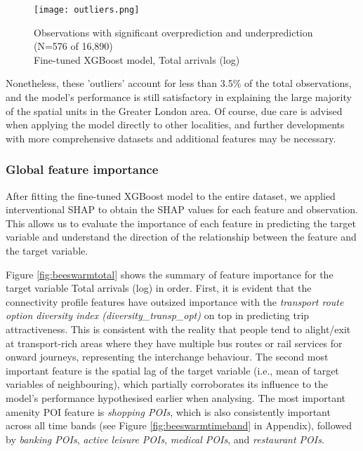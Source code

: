 \begin{figure}[ht]
    \centering
    \texttt{[image: outliers.png]}
    \captionsetup{justification=centering}
    \caption{Observations with significant overprediction and underprediction (N=576 of 16,890)\\Fine-tuned XGBoost model, Total arrivals (log)}
    \label{fig:outliers}
\end{figure}

Nonetheless, these 'outliers' account for less than 3.5\% of the total observations, and the model's performance is still satisfactory in explaining the large majority of the spatial units in the Greater London area. Of course, due care is advised when applying the model directly to other localities, and further developments with more comprehensive datasets and additional features may be necessary.

\subsubsection*{Global feature importance}

After fitting the fine-tuned XGBoost model to the entire dataset, we applied interventional SHAP to obtain the SHAP values for each feature and observation. This allows us to evaluate the importance of each feature in predicting the target variable and understand the direction of the relationship between the feature and the target variable. 

Figure \ref{fig:beeswarmtotal} shows the summary of feature importance for the target variable Total arrivals (log) in order. First, it is evident that the connectivity profile features have outsized importance with the \textit{transport route option diversity index (diversity\_transp\_opt)} on top in predicting trip attractiveness. This is consistent with the reality that people tend to alight/exit at transport-rich areas where they have multiple bus routes or rail services for onward journeys, representing the interchange behaviour. The second most important feature is the spatial lag of the target variable (i.e., mean of target variables of neighbouring), which partially corroborates its influence to the model's performance hypothesised earlier when analysing. The most important amenity POI feature is \textit{shopping POIs}, which is also consistently important across all time bands (see Figure \ref{fig:beeswarmtimeband} in Appendix), followed by \textit{banking POIs}, \textit{active leisure POIs}, \textit{medical POIs}, and \textit{restaurant POIs}.

